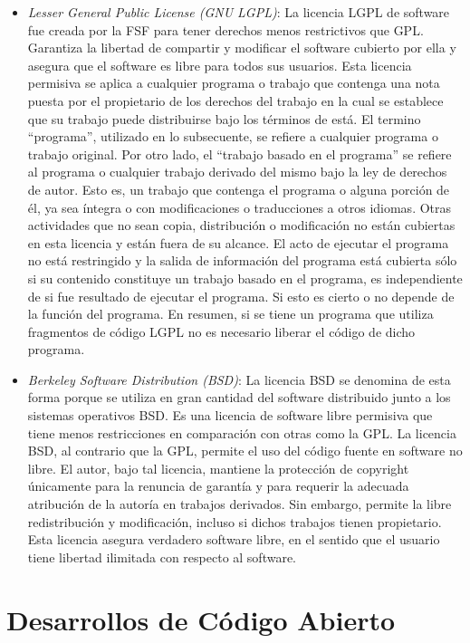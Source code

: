 \begin {itemize}
\item \textit{Lesser General Public License (GNU LGPL)}: La licencia
  LGPL de software fue creada por la FSF para tener derechos menos
  restrictivos que GPL. Garantiza la libertad de compartir y modificar
  el software cubierto por ella y asegura que el software es libre
  para todos sus usuarios. Esta licencia permisiva se aplica a
  cualquier programa o trabajo que contenga una nota puesta por el
  propietario de los derechos del trabajo en la cual se establece que
  su trabajo puede distribuirse bajo los términos de está. El
  termino ``programa'', utilizado en lo subsecuente, se refiere a
  cualquier programa o trabajo original. Por otro lado, el ``trabajo
  basado en el programa'' se refiere al programa o cualquier trabajo
  derivado del mismo bajo la ley de derechos de autor. Esto es, un
  trabajo que contenga el programa o alguna porción de él, ya sea
  íntegra o con modificaciones o traducciones a otros idiomas. Otras
  actividades que no sean copia, distribución o modificación no están
  cubiertas en esta licencia y están fuera de su alcance. El acto de
  ejecutar el programa no está restringido y la salida de información
  del programa está cubierta sólo si su contenido constituye un
  trabajo basado en el programa, es independiente de si fue resultado
  de ejecutar el programa. Si esto es cierto o no depende de la
  función del programa. En resumen, si se tiene un programa que
  utiliza fragmentos de código LGPL no es necesario liberar el código
  de dicho programa.

\item \textit{Berkeley Software Distribution (BSD)}: La licencia BSD se denomina de esta forma porque se utiliza en gran cantidad del
  software distribuido junto a los sistemas operativos BSD. Es una
  licencia de software libre permisiva que tiene menos restricciones
  en comparación con otras como la GPL. La licencia BSD, al contrario
  que la GPL, permite el uso del código fuente en software no
  libre. El autor, bajo tal licencia, mantiene la protección de
  copyright únicamente para la renuncia de garantía y para requerir la
  adecuada atribución de la autoría en trabajos derivados. Sin
  embargo, permite la libre redistribución y modificación, incluso si
  dichos trabajos tienen propietario. Esta licencia asegura verdadero
  software libre, en el sentido que el usuario tiene libertad
  ilimitada con respecto al software.
\end {itemize}


\section{Desarrollos de Código Abierto}


